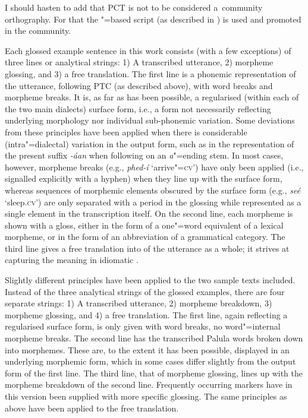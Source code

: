 {I should hasten to add that PCT is not to be considered a~community
orthography. For that  the \iliArabic"=based script (as described in ) is used and promoted in the community.


Each glossed example sentence in this work consists (with a few exceptions) of three lines or analytical strings: 1) A transcribed utterance, 2) morpheme glossing, and 3) a free translation. The first line is a phonemic representation of the utterance, following PTC (as described above), with word breaks and morpheme breaks. It is, as far as has been possible, a regularised (within each of the two main dialects) surface form, i.e., a form not necessarily reflecting underlying morphology nor individual sub-phonemic variation. Some deviations from these principles have been applied when there is considerable (intra"=dialectal) variation in the output form, such as in the representation of the present  suffix \textit{-áan} when following on an \textit{a}"=ending stem. In most cases, however, morpheme breaks (e.g., \textit{phed-í} `arrive"=\textsc{cv}') have only been applied (i.e., signalled explicitly with a hyphen) when they line up with the surface form, whereas  sequences of morphemic elements obscured by the surface form (e.g., \textit{seé} `sleep.\textsc{cv}') are only separated with a period in the glossing while represented as a single element in the transcription itself. On the second line, each morpheme is shown with a gloss, either in the form of a one"=word \iliEnglish equivalent of a lexical morpheme, or in the form of an abbreviation of a grammatical category. The third line gives a free translation into \iliEnglish of the utterance as a whole; it strives at capturing the meaning in idiomatic \iliEnglish.


Slightly different principles have been applied to the two sample texts included. Instead of the three analytical strings of the glossed examples, there are four separate strings: 1) A transcribed utterance, 2) morpheme breakdown, 3) morpheme glossing, and 4) a free translation. The first line, again reflecting a regularised surface form, is only given with word breaks, no word"=internal morpheme breaks. The second line has the transcribed Palula words broken down into morphemes. These are, to the extent it has been possible, displayed in an underlying morphemic form, which in some cases differ slightly from the output form of the first line. The third line, that of morpheme glossing, lines up with the morpheme breakdown of the second line. Frequently occurring markers have in this version been supplied with more specific glossing. The same principles as above have been applied to the free translation. 

}

